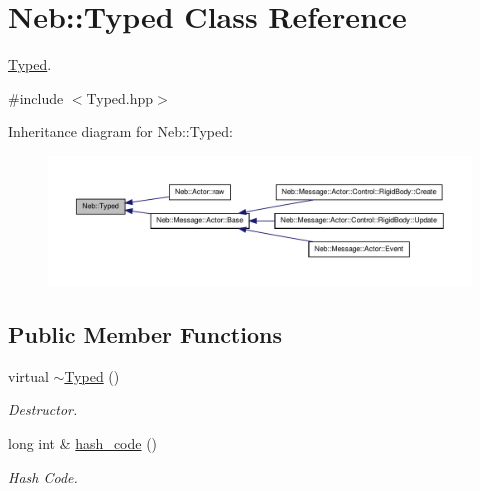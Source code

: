 \hypertarget{classNeb_1_1Typed}{\section{\-Neb\-:\-:\-Typed \-Class \-Reference}
\label{classNeb_1_1Typed}
}


\hyperlink{classNeb_1_1Typed}{\-Typed}.  




{\ttfamily \#include $<$\-Typed.\-hpp$>$}



\-Inheritance diagram for \-Neb\-:\-:\-Typed\-:
\nopagebreak
\begin{figure}[H]
\begin{center}
\leavevmode
\includegraphics[width=350pt]{classNeb_1_1Typed__inherit__graph}
\end{center}
\end{figure}
\subsection*{\-Public \-Member \-Functions}
\begin{DoxyCompactItemize}
\item 
\hypertarget{classNeb_1_1Typed_ac7a0fd653ad4c09abc20fc9f24942042}{virtual \hyperlink{classNeb_1_1Typed_ac7a0fd653ad4c09abc20fc9f24942042}{$\sim$\-Typed} ()}\label{classNeb_1_1Typed_ac7a0fd653ad4c09abc20fc9f24942042}

\begin{DoxyCompactList}\small\item\em \-Destructor. \end{DoxyCompactList}\item 
\hypertarget{classNeb_1_1Typed_a75878612e933c37ce060bb0d63889051}{long int \& \hyperlink{classNeb_1_1Typed_a75878612e933c37ce060bb0d63889051}{hash\-\_\-code} ()}\label{classNeb_1_1Typed_a75878612e933c37ce060bb0d63889051}

\begin{DoxyCompactList}\small\item\em \-Hash \-Code. \end{DoxyCompactList}\end{DoxyCompactItemize}
